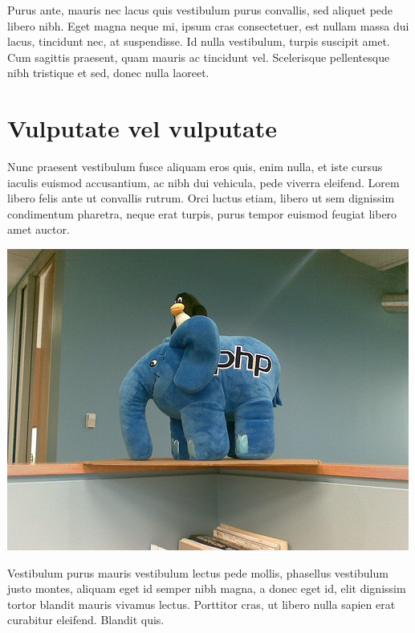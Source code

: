 \documentclass[12pt]{article}
\begin{document}
Purus ante, mauris nec lacus quis vestibulum purus convallis, sed aliquet pede libero nibh. Eget magna neque mi, ipsum cras consectetuer, est nullam massa dui lacus, tincidunt nec, at suspendisse. Id nulla vestibulum, turpis suscipit amet. Cum sagittis praesent, quam mauris ac tincidunt vel. Scelerisque pellentesque nibh tristique et sed, donec nulla laoreet.

\section{Vulputate vel vulputate}

Nunc praesent vestibulum fusce aliquam eros quis, enim nulla, et iste cursus iaculis euismod accusantium, ac nibh dui vehicula, pede viverra eleifend. Lorem libero felis ante ut convallis rutrum. Orci luctus etiam, libero ut sem dignissim condimentum pharetra, neque erat turpis, purus tempor euismod feugiat libero amet auctor. 

\noindent\includegraphics[width=\linewidth]{php}

Vestibulum purus mauris vestibulum lectus pede mollis, phasellus vestibulum justo montes, aliquam eget id semper nibh magna, a donec eget id, elit dignissim tortor blandit mauris vivamus lectus. Porttitor cras, ut libero nulla sapien erat curabitur eleifend. Blandit quis.
\end{document}
